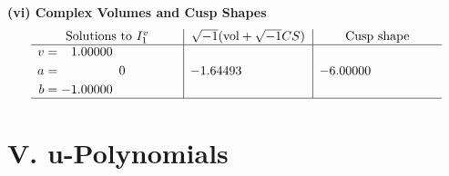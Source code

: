 \documentclass[1p]{elsarticle_modified}
\theoremstyle{definition}
\newcommand{\I}{\sqrt{-1}}
\begin{document}
\newpage\flushleft \textbf{(vi) Complex Volumes and Cusp Shapes}
$$\begin{array}{c|c|c}  
\text{Solutions to }I^v_{1}& \I (\text{vol} + \sqrt{-1}CS) & \text{Cusp shape}\\
 \hline 
\begin{aligned}
v &= \phantom{-}1.00000\phantom{ +0.000000I} \\
a &= \phantom{-0.000000 } 0 \\
b &= -1.00000\phantom{ +0.000000I}\end{aligned}
 & -1.64493\phantom{ +0.000000I} & -6.00000\phantom{ +0.000000I}\\
 \hline 
 \end{array}$$\newpage
\newpage\renewcommand{\arraystretch}{1}
\centering \section*{ V. u-Polynomials}
\end{document}
